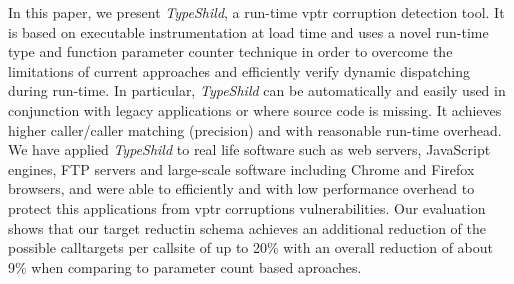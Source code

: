 In this paper, we present \textit{TypeShild}, a run-time vptr corruption
detection tool. It is based on executable instrumentation at load time
and uses a novel run-time type and function parameter counter technique
in order to overcome the limitations of current approaches and efficiently
verify dynamic dispatching during run-time.
In particular, \textit{TypeShild} can be automatically and easily used
in conjunction with legacy applications or where source code is missing.
It achieves higher caller/caller matching (precision) and with reasonable
run-time overhead.
We have applied \textit{TypeShild} to real life software such as
web servers, JavaScript engines, FTP servers and large-scale software
including Chrome and Firefox browsers, and were able to efficiently
and with low performance overhead to protect this applications from 
vptr corruptions vulnerabilities.
Our evaluation shows that our target reductin schema achieves an additional
reduction of the possible calltargets per callsite of up to 
20\% with an overall reduction of about 9\% when comparing 
to parameter count based aproaches.
